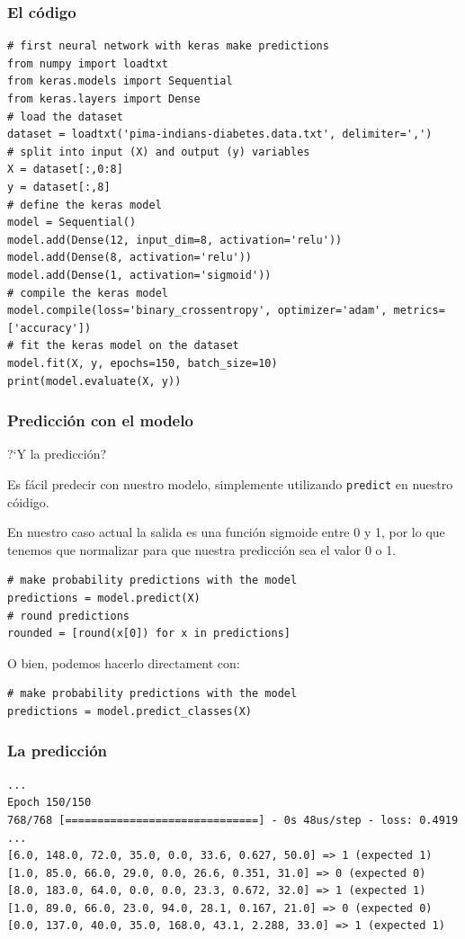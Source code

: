\documentclass[9pt, xcolor=svgnames, dvipsnames]{beamer}
\begin{document}
\begin{frame}[fragile]
\frametitle{El c\'odigo}
\begin{verbatim}
# first neural network with keras make predictions
from numpy import loadtxt
from keras.models import Sequential
from keras.layers import Dense
# load the dataset
dataset = loadtxt('pima-indians-diabetes.data.txt', delimiter=',')
# split into input (X) and output (y) variables
X = dataset[:,0:8]
y = dataset[:,8]
# define the keras model
model = Sequential()
model.add(Dense(12, input_dim=8, activation='relu'))
model.add(Dense(8, activation='relu'))
model.add(Dense(1, activation='sigmoid'))
# compile the keras model
model.compile(loss='binary_crossentropy', optimizer='adam', metrics=['accuracy'])
# fit the keras model on the dataset
model.fit(X, y, epochs=150, batch_size=10)
print(model.evaluate(X, y))
\end{verbatim}
\end{frame}

\begin{frame}[fragile]
\frametitle{Predicci\'on con el modelo}
?`Y la predicci\'on?

Es f\'acil predecir con nuestro modelo, simplemente utilizando \texttt{predict} en nuestro c\'oidigo. 

En nuestro caso actual la salida es una funci\'on sigmoide entre 0 y 1, por lo que tenemos que normalizar para que nuestra predicci\'on sea el valor 0 o 1.

\begin{verbatim}
# make probability predictions with the model
predictions = model.predict(X)
# round predictions 
rounded = [round(x[0]) for x in predictions]
\end{verbatim}

O bien, podemos hacerlo directament con:
\begin{verbatim}
# make probability predictions with the model
predictions = model.predict_classes(X)
\end{verbatim}
\end{frame}

\begin{frame}[fragile]
\frametitle{La predicci\'on}
\footnotesize
\begin{verbatim}
...
Epoch 150/150
768/768 [==============================] - 0s 48us/step - loss: 0.4919 ...
[6.0, 148.0, 72.0, 35.0, 0.0, 33.6, 0.627, 50.0] => 1 (expected 1)
[1.0, 85.0, 66.0, 29.0, 0.0, 26.6, 0.351, 31.0] => 0 (expected 0)
[8.0, 183.0, 64.0, 0.0, 0.0, 23.3, 0.672, 32.0] => 1 (expected 1)
[1.0, 89.0, 66.0, 23.0, 94.0, 28.1, 0.167, 21.0] => 0 (expected 0)
[0.0, 137.0, 40.0, 35.0, 168.0, 43.1, 2.288, 33.0] => 1 (expected 1)
\end{verbatim}
    
\end{frame}
\end{document}
